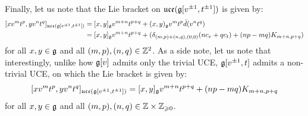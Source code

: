 \begin{example}
            Finally, let us note that the Lie bracket on $\mathfrak{uce}(\mathfrak{g}[v^{\pm 1}, t^{\pm 1}])$ is given by:
                $$
                    \begin{aligned}
                        [x v^m t^p, y v^n t^q]_{\uce(\g[v^{\pm 1}, t^{\pm 1}])} & = [x, y]_{\g} v^{m + n} t^{p + q} + (x, y)_{\g} v^m t^p \bar{d}(v^n t^q)
                        \\
                        & = [x, y]_{\g} v^{m + n} t^{p + q} + ( \delta_{(m, p) + (n, q), (0, 0)} ( n c_v + q c_t ) + (np - mq) K_{m + n, p + q} )
                    \end{aligned}
                $$
            for all $x, y \in \mathfrak{g}$ and all $(m, p), (n, q) \in \mathbb{Z}^2$. As a side note, let us note that interestingly, unlike how $\mathfrak{g}[v]$ admits only the trivial UCE, $\mathfrak{g}[v^{\pm 1}, t]$ admits a non-trivial UCE, on which the Lie bracket is given by:
                $$[x v^m t^p, y v^n t^q]_{\mathfrak{uce}(\mathfrak{g}[v^{\pm 1}, t^{\pm 1}])} = [x, y]_{\mathfrak{g}} v^{m + n} t^{p + q} + (np - mq) K_{m + n, p + q}$$
            for all $x, y \in \mathfrak{g}$ and all $(m, p), (n, q) \in \Z \x \Z_{\geq 0}$.
        \end{example}
